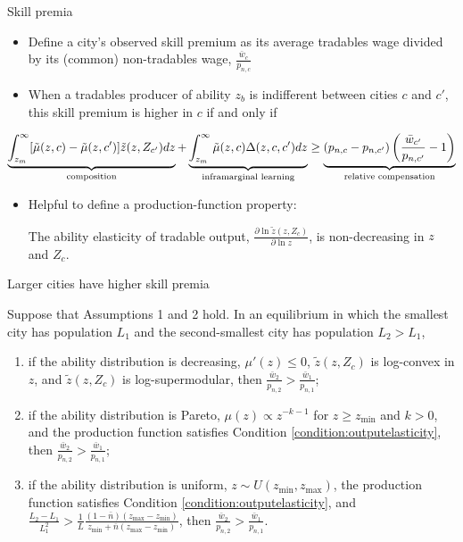 \documentclass[11pt,notes=hide,aspectratio=169]{beamer}
\begin{document}
\begin{frame}{Skill premia}
\begin{itemize}
	\item Define a city's observed skill premium as its average tradables wage divided by its (common) non-tradables wage, $\frac{\bar{w}_{c}}{p_{n,c}}$
	\item When a tradables producer of ability $z_b$ is indifferent between cities $c$ and $c'$, this skill premium is higher in $c$ if and only if
\end{itemize}
\begin{equation*}
\underbrace{\int_{z_m}^{\infty}[\tilde{\mu}(z,c)-\tilde{\mu}(z,c')]\tilde{z}(z,Z_{c'})dz}_{\textnormal{composition}}
+\underbrace{\int_{z_m}^{\infty}\tilde{\mu}(z,c)\Delta(z,c,c')dz}_{\textnormal{inframarginal learning}}
\geq \underbrace{\left(p_{n,c}-p_{n,c'}\right)\left(\frac{\bar{w}_{c'}}{p_{n,c'}}-1\right)}_{\textnormal{relative compensation}}\label{eqn:premia_decomp}
\end{equation*}
\begin{itemize}
	\item Helpful to define a production-function property: 
	\begin{condition}\label{condition:outputelasticity}
	The ability elasticity of tradable output,
	$\frac{\partial\ln\tilde{z}\left(z,Z_{c}\right)}{\partial\ln z}$,
	is non-decreasing in $z$ and $Z_{c}$.
	\end{condition}
\end{itemize}
\end{frame}
\begin{frame}{Larger cities have higher skill premia}
\begin{proposition} \label{prop:skillpremia}
Suppose that Assumptions 1 and 2 hold.
In an equilibrium in which the smallest city has population $L_{1}$ and the second-smallest city has population $L_{2}>L_{1}$,
\begin{enumerate}
\item if the ability distribution is decreasing, $\mu'(z)\leq0$, $\tilde{z}(z,Z_{c})$ is log-convex in $z$, and $\tilde{z}(z,Z_{c})$ is log-supermodular, then $\frac{\bar{w}_{2}}{p_{n,2}}>\frac{\bar{w}_{1}}{p_{n,1}}$;
\item if the ability distribution is Pareto, $\mu(z)\propto z^{-k-1}$ for $z\geq z_{\min}$ and $k>0$, and the production function satisfies Condition \ref{condition:outputelasticity}, then $\frac{\bar{w}_{2}}{p_{n,2}}>\frac{\bar{w}_{1}}{p_{n,1}}$;
\item if the ability distribution is uniform, $z\sim U\left(z_{\min},z_{\max}\right)$, the production function satisfies Condition \ref{condition:outputelasticity}, and $\frac{L_2 - L_1}{L_1^2} > \frac{1}{L}\frac{(1-\bar{n})(z_{\max} - z_{\min})}{z_{\min} +\bar{n}(z_{\max} - z_{\min})}$, then $\frac{\bar{w}_{2}}{p_{n,2}}>\frac{\bar{w}_{1}}{p_{n,1}}$.
\end{enumerate}
\end{proposition}
\end{frame}
\end{document}
